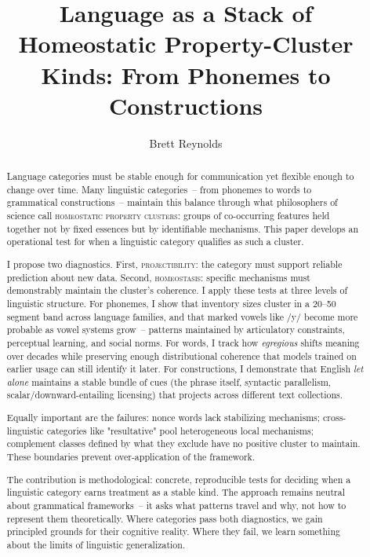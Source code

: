 \documentclass[12pt]{article}
\title{Language as a Stack of Homeostatic Property-Cluster Kinds: From Phonemes to Constructions}
\author{Brett Reynolds}
\date{}
\begin{document}
\maketitle
\doublespacing

\begin{abstract}
\noindent Language categories must be stable enough for communication yet flexible enough to change over time. Many linguistic categories~-- from phonemes to words to grammatical constructions~-- maintain this balance through what philosophers of science call \textsc{homeostatic property clusters}: groups of co-occurring features held together not by fixed essences but by identifiable mechanisms. This paper develops an operational test for when a linguistic category qualifies as such a cluster. 

I propose two diagnostics. First, \textsc{projectibility}: the category must support reliable prediction about new data. Second, \textsc{homeostasis}: specific mechanisms must demonstrably maintain the cluster's coherence. I apply these tests at three levels of linguistic structure. For phonemes, I show that inventory sizes cluster in a 20–50 segment band across language families, and that marked vowels like /y/ become more probable as vowel systems grow~-- patterns maintained by articulatory constraints, perceptual learning, and social norms. For words, I track how \textit{egregious} shifts meaning over decades while preserving enough distributional coherence that models trained on earlier usage can still identify it later. For constructions, I demonstrate that English \textit{let alone} \citep{FillmoreKayOConnor1988} maintains a stable bundle of cues (the phrase itself, syntactic parallelism, scalar/downward-entailing licensing) that projects across different text collections.

Equally important are the failures: nonce words lack stabilizing mechanisms; cross-linguistic categories like "resultative" pool heterogeneous local mechanisms; complement classes defined by what they exclude have no positive cluster to maintain. These boundaries prevent over-application of the framework.

The contribution is methodological: concrete, reproducible tests for deciding when a linguistic category earns treatment as a stable kind. The approach remains neutral about grammatical frameworks~-- it asks what patterns travel and why, not how to represent them theoretically. Where categories pass both diagnostics, we gain principled grounds for their cognitive reality. Where they fail, we learn something about the limits of linguistic generalization.
\end{abstract}
\end{document}
